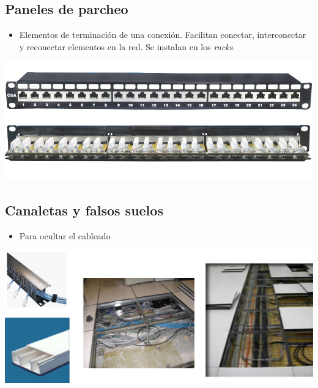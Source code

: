 \documentclass[11pt]{article}
\begin{document}
\subsection{Paneles de parcheo}
\label{sec:orge8df113}
\begin{itemize}
\item Elementos de terminación de una conexión. Facilitan conectar, interconectar y reconectar elementos en la red. Se instalan en los \emph{racks}.
\end{itemize}
\begin{center}
\includegraphics[width=.9\linewidth]{./media/667233583716241408.png}
\end{center}
\subsection{Canaletas y falsos suelos}
\label{sec:org9151fae}
\begin{itemize}
\item Para ocultar el cableado
\end{itemize}
\begin{center}
\includegraphics[width=.9\linewidth]{./media/canaleta-falsoSuelo.png}
\end{center}
\end{document}
